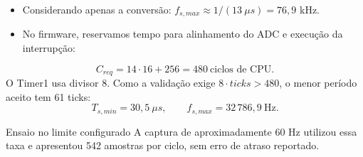 \begin{itemize}
\item Considerando apenas a conversão: $f_{s,max}\approx1/(13\ \mu s)=76{,}9$ kHz.
\item No firmware, reservamos tempo para alinhamento do ADC e execução da interrupção:
\end{itemize}
\[
C_{req}=14\cdot16+256=480\ \text{ciclos de CPU}.
\]
O Timer1 usa divisor 8. Como a validação exige $8\cdot ticks>480$, o menor período aceito tem 61 ticks:
\[
T_{s,min}=30{,}5\ \mu s,\qquad
\boxed{f_{s,max}=32\,786{,}9\ \text{Hz}}.
\]
\begin{exampleblock}{Ensaio no limite configurado}
A captura de aproximadamente 60 Hz utilizou essa taxa e apresentou 542 amostras por ciclo, sem erro de atraso reportado.
\end{exampleblock}
